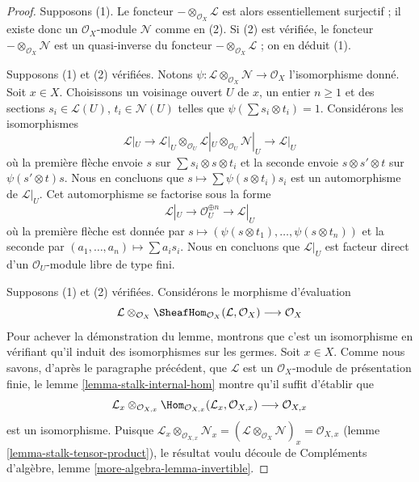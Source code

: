 \begin{proof}
Supposons (1). Le foncteur $- \otimes_{\mathcal{O}_X} \mathcal{L}$
est alors essentiellement surjectif ; il existe donc un $\mathcal{O}_X$-module
$\mathcal{N}$ comme en (2). Si (2) est vérifiée, le foncteur
$- \otimes_{\mathcal{O}_X} \mathcal{N}$ est un quasi-inverse
du foncteur $- \otimes_{\mathcal{O}_X} \mathcal{L}$ ;
on en déduit (1).

\medskip\noindent
Supposons (1) et (2) vérifiées. Notons
$\psi : \mathcal{L} \otimes_{\mathcal{O}_X} \mathcal{N} \to \mathcal{O}_X$
l'isomorphisme donné. Soit $x \in X$. Choisissons un voisinage ouvert
$U$ de $x$, un entier $n \geq 1$ et des sections $s_i \in \mathcal{L}(U)$,
$t_i \in \mathcal{N}(U)$ telles que $\psi(\sum s_i \otimes t_i) = 1$.
Considérons les isomorphismes
$$
\mathcal{L}|_U \to
\mathcal{L}|_U \otimes_{\mathcal{O}_U}
\mathcal{L}|_U \otimes_{\mathcal{O}_U} \mathcal{N}|_U \to \mathcal{L}|_U
$$
où la première flèche envoie $s$ sur $\sum s_i \otimes s \otimes t_i$
et la seconde envoie $s \otimes s' \otimes t$ sur $\psi(s' \otimes t)s$.
Nous en concluons que $s \mapsto \sum \psi(s \otimes t_i)s_i$ est
un automorphisme de $\mathcal{L}|_U$. Cet automorphisme se factorise sous la forme
$$
\mathcal{L}|_U \to \mathcal{O}_U^{\oplus n} \to \mathcal{L}|_U
$$
où la première flèche est donnée par
$s \mapsto (\psi(s \otimes t_1), \ldots, \psi(s \otimes t_n))$
et la seconde par $(a_1, \ldots, a_n) \mapsto \sum a_i s_i$.
Nous en concluons que $\mathcal{L}|_U$ est facteur direct
d'un $\mathcal{O}_U$-module libre de type fini.

\medskip\noindent
Supposons (1) et (2) vérifiées. Considérons le morphisme d'évaluation
$$
\mathcal{L} \otimes_{\mathcal{O}_X}
\SheafHom_{\mathcal{O}_X}(\mathcal{L}, \mathcal{O}_X)
\longrightarrow \mathcal{O}_X
$$
Pour achever la démonstration du lemme,
montrons que c'est un isomorphisme en vérifiant qu'il induit
des isomorphismes sur les germes. Soit $x \in X$.
Comme nous savons, d'après le paragraphe précédent,
que $\mathcal{L}$ est un $\mathcal{O}_X$-module
de présentation finie,
le lemme \ref{lemma-stalk-internal-hom}
montre qu'il suffit d'établir que
$$
\mathcal{L}_x \otimes_{\mathcal{O}_{X, x}}
\Hom_{\mathcal{O}_{X, x}}(\mathcal{L}_x, \mathcal{O}_{X, x})
\longrightarrow \mathcal{O}_{X, x}
$$
est un isomorphisme. Puisque
$\mathcal{L}_x \otimes_{\mathcal{O}_{X, x}} \mathcal{N}_x =
(\mathcal{L} \otimes_{\mathcal{O}_X} \mathcal{N})_x =
\mathcal{O}_{X, x}$ (lemme \ref{lemma-stalk-tensor-product}),
le résultat voulu découle de
Compléments d'algèbre, lemme \ref{more-algebra-lemma-invertible}.
\end{proof}


